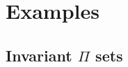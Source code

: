 \documentclass[11pt]{article}
\theoremstyle{plain}
\newtheorem{lem}{Lemma}[section]
\begin{document}


\section{Examples}

\subsection{Invariant $\Pi$ sets}






\end{document}
